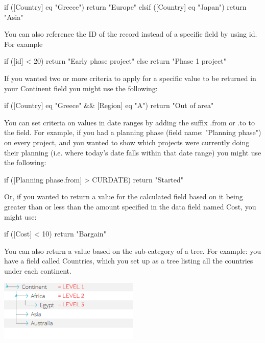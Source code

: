 \documentclass{ctrlo-int-toc}
\begin{document}
\begin{admin}
\begin{enumerate}
\begin{code}
if ([Country] eq "Greece") {
    return "Europe"
} elsif ([Country] eq "Japan") {
    return "Asia"
}
\end{code}

You can also reference the ID of the record instead of a specific field by using id. For example

\begin{code}
if ([id] < 20) {
    return "Early phase project"
} else {
    return "Phase 1 project"
}
\end{code}

If you wanted two or more criteria to apply for a specific value to be returned in your Continent field you might use the following:

\begin{code}
if ([Country] eq "Greece" && [Region] eq "A") {
    return "Out of area"
}
\end{code}

You can set criteria on values in date ranges by adding the suffix {\textquotedbl}.from{\textquotedbl} or {\textquotedbl}.to{\textquotedbl} to the field. For example, if you had a planning phase (field name: "Planning phase") on every project, and you wanted to show which projects were currently doing their planning (i.e. where today's date falls within that date range) you might use the following:

\begin{code}
if ([Planning phase.from] > CURDATE) {
    return "Started"
}
\end{code}

Or, if you wanted to return a value for the calculated field based on it being greater than or less than the amount specified in the data field named Cost, you might use: 

\begin{code}
if ([Cost] < 10) {
    return "Bargain"
}
\end{code}

You can also return a value based on the sub-category of a tree. For example: you have a field called Countries, which you set up as a tree listing all the countries under each continent.

\includegraphics[width=6.692cm,height=2.903cm]{userguide-img/userguide-img010.png}
 


\end{enumerate}
\end{admin}
\end{document}
